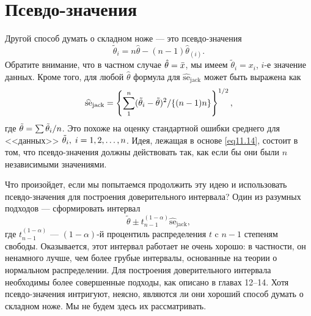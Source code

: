 \section{Псевдо-значения}

Другой способ думать о складном ноже --- это псевдо-значения
\begin{equation}\label{eq11.14}
    \widetilde{\theta}_{i} = n\hat{\theta} - (n-1)\hat{\theta}_{(i)}.
\end{equation}
Обратите внимание, что в частном случае $\hat{\theta} = \Bar{x}$, мы имеем $\widetilde{\theta}_{i} = x_{i}$, $i$-е значение данных. Кроме того, для любой $\hat{\theta}$ формула для $\widehat{\text{se}}_{\text{jack}}$ может быть выражена как
\begin{equation}\label{eq11.15}
    \widehat{\text{se}}_{\text{jack}} = \left\{\sum\limits_{1}^{n}(\Tilde{\theta}_{i} - \Tilde{\theta})^2/\{(n-1)n\}\right\}^{1/2},
\end{equation}
где $\Tilde{\theta} = \sum\Tilde{\theta}_{i}/n$. Это похоже на оценку стандартной ошибки среднего для <<данных>> $\Tilde{\theta}_{i},\; i = 1, 2, \dots, n$. Идея, лежащая в основе \ref{eq11.14}, состоит в том, что псевдо-значения должны действовать так, как если бы они были $n$ независимыми значениями.

Что произойдет, если мы попытаемся продолжить эту идею и использовать псевдо-значения для построения доверительного интервала? Один из разумных подходов --- сформировать интервал
\begin{equation}\label{eq11.16}
    \widetilde{\theta} \pm t_{n-1}^{(1-\alpha)}\widehat{\text{se}}_{\text{jack}},
\end{equation}
где $t_{n-1}^{(1-\alpha)}$ --- $(1-\alpha)$-й процентиль распределения $t$ c $n-1$ степеням свободы. Оказывается, этот интервал работает не очень хорошо: в частности, он ненамного лучше, чем более грубые интервалы, основанные на теории о нормальном распределении. Для построения доверительного интервала необходимы более совершенные подходы, как описано в главах 12–14. Хотя псевдо-значения интригуют, неясно, являются ли они хороший способ думать о складном ноже. Мы не будем здесь их рассматривать.
